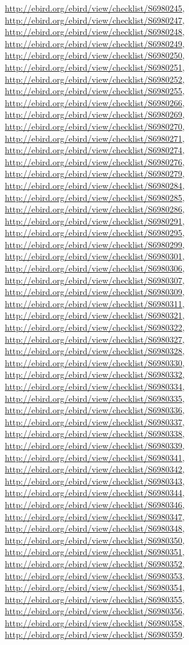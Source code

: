 \documentclass[9pt, article]{memoir}
\begin{document}
\begin{multicols}{2}
\url{http://ebird.org/ebird/view/checklist/S6980245}, 
\url{http://ebird.org/ebird/view/checklist/S6980247}, 
\url{http://ebird.org/ebird/view/checklist/S6980248}, 
\url{http://ebird.org/ebird/view/checklist/S6980249}, 
\url{http://ebird.org/ebird/view/checklist/S6980250}, 
\url{http://ebird.org/ebird/view/checklist/S6980251}, 
\url{http://ebird.org/ebird/view/checklist/S6980252}, 
\url{http://ebird.org/ebird/view/checklist/S6980255}, 
\url{http://ebird.org/ebird/view/checklist/S6980266}, 
\url{http://ebird.org/ebird/view/checklist/S6980269}, 
\url{http://ebird.org/ebird/view/checklist/S6980270}, 
\url{http://ebird.org/ebird/view/checklist/S6980271}, 
\url{http://ebird.org/ebird/view/checklist/S6980274}, 
\url{http://ebird.org/ebird/view/checklist/S6980276}, 
\url{http://ebird.org/ebird/view/checklist/S6980279}, 
\url{http://ebird.org/ebird/view/checklist/S6980284}, 
\url{http://ebird.org/ebird/view/checklist/S6980285}, 
\url{http://ebird.org/ebird/view/checklist/S6980286}, 
\url{http://ebird.org/ebird/view/checklist/S6980291}, 
\url{http://ebird.org/ebird/view/checklist/S6980295}, 
\url{http://ebird.org/ebird/view/checklist/S6980299}, 
\url{http://ebird.org/ebird/view/checklist/S6980301}, 
\url{http://ebird.org/ebird/view/checklist/S6980306}, 
\url{http://ebird.org/ebird/view/checklist/S6980307}, 
\url{http://ebird.org/ebird/view/checklist/S6980309}, 
\url{http://ebird.org/ebird/view/checklist/S6980311}, 
\url{http://ebird.org/ebird/view/checklist/S6980321}, 
\url{http://ebird.org/ebird/view/checklist/S6980322}, 
\url{http://ebird.org/ebird/view/checklist/S6980327}, 
\url{http://ebird.org/ebird/view/checklist/S6980328}, 
\url{http://ebird.org/ebird/view/checklist/S6980330}, 
\url{http://ebird.org/ebird/view/checklist/S6980332}, 
\url{http://ebird.org/ebird/view/checklist/S6980334}, 
\url{http://ebird.org/ebird/view/checklist/S6980335}, 
\url{http://ebird.org/ebird/view/checklist/S6980336}, 
\url{http://ebird.org/ebird/view/checklist/S6980337}, 
\url{http://ebird.org/ebird/view/checklist/S6980338}, 
\url{http://ebird.org/ebird/view/checklist/S6980339}, 
\url{http://ebird.org/ebird/view/checklist/S6980341}, 
\url{http://ebird.org/ebird/view/checklist/S6980342}, 
\url{http://ebird.org/ebird/view/checklist/S6980343}, 
\url{http://ebird.org/ebird/view/checklist/S6980344}, 
\url{http://ebird.org/ebird/view/checklist/S6980346}, 
\url{http://ebird.org/ebird/view/checklist/S6980347}, 
\url{http://ebird.org/ebird/view/checklist/S6980348}, 
\url{http://ebird.org/ebird/view/checklist/S6980350}, 
\url{http://ebird.org/ebird/view/checklist/S6980351}, 
\url{http://ebird.org/ebird/view/checklist/S6980352}, 
\url{http://ebird.org/ebird/view/checklist/S6980353}, 
\url{http://ebird.org/ebird/view/checklist/S6980354}, 
\url{http://ebird.org/ebird/view/checklist/S6980355}, 
\url{http://ebird.org/ebird/view/checklist/S6980356}, 
\url{http://ebird.org/ebird/view/checklist/S6980358}, 
\url{http://ebird.org/ebird/view/checklist/S6980359}.


\end{multicols}
\end{document}

